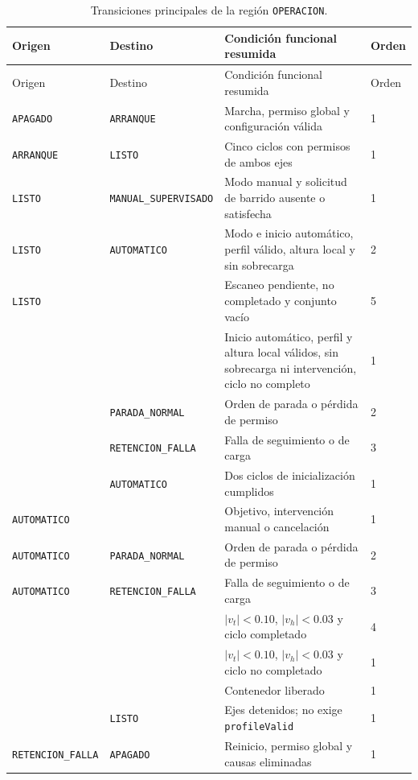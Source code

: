 \documentclass[a4paper,10pt,onecolumn,journal]{ieeeconf}
\numberwithin{equation}{section}
\begin{document}
{\footnotesize
{}
\begin{longtable}{L{3.5cm} L{3.5cm} L{6.4cm} C{1.0cm}}
\caption{Transiciones principales de la región \texttt{OPERACION}.}\label{tab:transiciones_operacion}\\
\toprule
Origen & Destino & Condición funcional resumida & Orden\\
\midrule
\endfirsthead
\toprule
Origen & Destino & Condición funcional resumida & Orden\\
\midrule
\endhead
\texttt{APAGADO} & \texttt{ARRANQUE} & Marcha, permiso global y configuración válida & 1\\
\texttt{ARRANQUE} & \texttt{LISTO} & Cinco ciclos con permisos de ambos ejes & 1\\
\texttt{LISTO} & \texttt{MANUAL\_SUPERVISADO} & Modo manual y solicitud de barrido ausente o satisfecha & 1\\
\texttt{LISTO} & \texttt{AUTOMATICO} & Modo e inicio automático, perfil válido, altura local y sin sobrecarga & 2\\
\texttt{LISTO} &  & Escaneo pendiente, no completado y conjunto vacío & 5\\
 &  & Inicio automático, perfil y altura local válidos, sin sobrecarga ni intervención, ciclo no completo & 1\\
 & \texttt{PARADA\_NORMAL} & Orden de parada o pérdida de permiso & 2\\
 & \texttt{RETENCION\_FALLA} & Falla de seguimiento o de carga & 3\\
 & \texttt{AUTOMATICO} & Dos ciclos de inicialización cumplidos & 1\\
\texttt{AUTOMATICO} &  & Objetivo, intervención manual o cancelación & 1\\
\texttt{AUTOMATICO} & \texttt{PARADA\_NORMAL} & Orden de parada o pérdida de permiso & 2\\
\texttt{AUTOMATICO} & \texttt{RETENCION\_FALLA} & Falla de seguimiento o de carga & 3\\
 &  & $|v_t|<0.10$, $|v_h|<0.03$ y ciclo completado & 4\\
 &  & $|v_t|<0.10$, $|v_h|<0.03$ y ciclo no completado & 1\\
 &  & Contenedor liberado & 1\\
 & \texttt{LISTO} & Ejes detenidos; no exige \texttt{profileValid} & 1\\
\texttt{RETENCION\_FALLA} & \texttt{APAGADO} & Reinicio, permiso global y causas eliminadas & 1\\
\bottomrule
\end{longtable}
}
\end{document}
